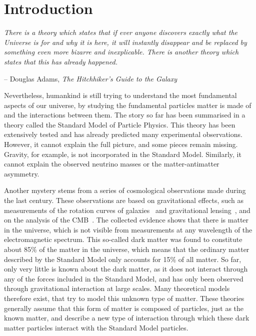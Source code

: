 \graphicspath{{chapt_dutch/}{intro/}{theory/}{detector/}{reconstruction/}}

\renewcommand\evenpagerightmark{{\scshape\small Chapter 1}}
\renewcommand\oddpageleftmark{{\scshape\small Introduction}}

\hyphenation{}

\chapter{Introduction}
\label{ch:intro}


\begin{flushleft} 
\textit{There is a theory which states that if ever anyone discovers exactly what the Universe is for and why it is here, it will instantly disappear and be replaced by something even more bizarre and inexplicable. There is another theory which states that this has already happened.}
\end{flushleft}
\begin{flushright}
-- Douglas Adams, \textit{The Hitchhiker's Guide to the Galaxy}
\end{flushright}

Nevertheless, humankind is still trying to understand the most fundamental aspects of our universe, by studying the fundamental particles matter is made of and the interactions between them. The story so far has been summarised in a theory called the Standard Model of Particle Physics. This theory has been extensively tested and has already predicted many experimental observations. However, it cannot explain the full picture, and some pieces remain missing. Gravity, for example, is not incorporated in the Standard Model. Similarly, it cannot explain the observed neutrino masses or the matter-antimatter asymmetry.

Another mystery stems from a series of cosmological observations made during the last century. These observations are based on gravitational effects, such as measurements of the rotation curves of galaxies~\cite{Begeman:1991iy} and gravitational lensing~\cite{Belokurov:2008pu}, and on the analysis of the \acf{CMB}~\cite{Smoot:1992td,Komatsu:2010fb,Ade:2013zuv}. The collected evidence shows that there is matter in the universe, which is not visible from measurements at any wavelength of the electromagnetic spectrum. This so-called dark matter was found to constitute about 85\% of the matter in the universe, which means that the ordinary matter described by the Standard Model only accounts for 15\% of all matter. So far, only very little is known about the dark matter, as it does not interact through any of the forces included in the Standard Model, and has only been observed through gravitational interaction at large scales. Many theoretical models therefore exist, that try to model this unknown type of matter. These theories generally assume that this form of matter is composed of particles, just as the known matter, and describe a new type of interaction through which these dark matter particles interact with the Standard Model particles.

